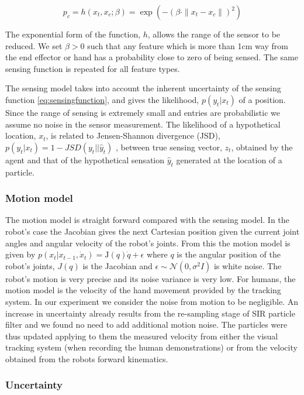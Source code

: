 \begin{equation}\label{eq:sensingfunction}
  p_c = h(x_t,x_c;\beta) = \exp\left( -\left(\beta \cdot \|x_t - x_c\|\right)^2 \right)
\end{equation}

The exponential form of the function, $h$, allows the range of the sensor to be reduced. We set $\beta > 0$ such that 
any feature which is more than 1cm way from the end effector or hand has a probability close to zero of being sensed. 
The same sensing function is repeated for all feature types.

The sensing model takes into account the inherent uncertainty of the sensing function \ref{eq:sensingfunction}, 
and gives the likelihood, $p(y_t|x_t)$ of a position. Since the range of sensing is extremely small and entries are probabilistic 
we assume no noise in the sensor measurement.
The likelihood of a hypothetical location, $x_t$,  is related to Jensen-Shannon divergence (JSD), $p(y_t|x_t) = 1 - JSD(y_t||\hat{y}_t)$ , between true sensing vector,
$z_t$, obtained by the agent and that of the hypothetical sensation $\hat{y}_t$ generated at the location of a particle. 


\subsubsection{Motion model}

The motion model is straight forward compared with the sensing model. In the robot's case the Jacobian gives the next 
Cartesian position given the current joint angles and angular velocity of the robot's joints.
From this the motion model is given by $ p(x_{t}|x_{t-1},\dot{x}_{t}) = \mathrm{J}(q)\dot{q} + \epsilon$ where $q$ is 
the angular position of the robot's joints, $J(q)$ is the Jacobian and $\epsilon \sim \mathcal{N}(0,\sigma^{2}I)$ is white noise. 
The robot's motion is very precise and its noise variance is very low. For humans, the motion model is the velocity of the hand 
movement provided by the tracking system. In our experiment we consider the noise from motion to be negligible. An increase in 
uncertainty already results from the re-sampling stage of SIR particle filter and we found no need to add additional motion noise.
The particles were thus updated applying to them the measured velocity from either the visual tracking system (when recording the 
human demonstrations) or from the velocity obtained from the robots forward kinematics.

\subsubsection{Uncertainty}


